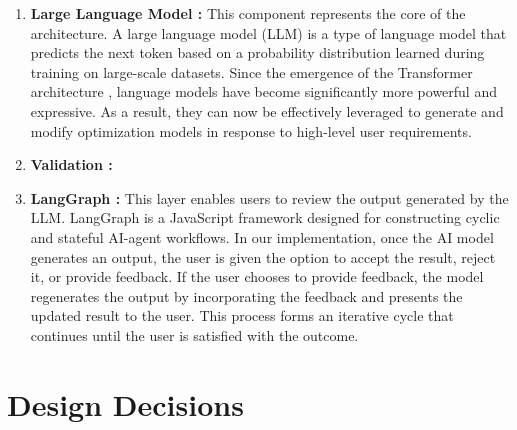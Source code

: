 \begin{enumerate}
    \item \textbf{Large Language Model : } This component represents the core of the architecture. A large language model (LLM) \cite{wikipediaLargeLanguage} is a type of language model that predicts the next token based on a probability distribution learned during training on large-scale datasets. Since the emergence of the Transformer architecture \cite{vaswani2023attentionneed}, language models have become significantly more powerful and expressive. As a result, they can now be effectively leveraged to generate and modify optimization models in response to high-level user requirements.

    \item \textbf{Validation : }

    \item \textbf{LangGraph : } This layer enables users to review the output generated by the LLM. LangGraph \cite{langchainLangGraph} is a JavaScript framework designed for constructing cyclic and stateful AI-agent workflows. In our implementation, once the AI model generates an output, the user is given the option to accept the result, reject it, or provide feedback. If the user chooses to provide feedback, the model regenerates the output by incorporating the feedback and presents the updated result to the user. This process forms an iterative cycle that continues until the user is satisfied with the outcome.
\end{enumerate}

\section{Design Decisions}